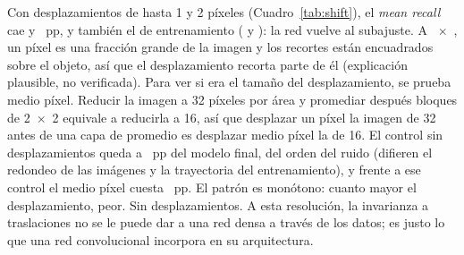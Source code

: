 {Con desplazamientos de hasta 1 y 2 píxeles (Cuadro~\ref{tab:shift}), el \emph{mean recall} cae
 y ~pp, y también el de entrenamiento ( y
): la red vuelve al subajuste. A ~$\times$~, un píxel es una
fracción grande de la imagen y los recortes están encuadrados sobre el objeto, así que el desplazamiento recorta parte
de él (explicación plausible, no verificada).}
{Para ver si era el tamaño del desplazamiento, se prueba medio píxel. Reducir la imagen a 32 píxeles por área y
promediar después bloques de 2~$\times$~2 equivale a reducirla a 16, así que desplazar un píxel la imagen de 32 antes
de una capa de promedio es desplazar medio píxel la de 16. El control sin desplazamientos queda a
~pp del modelo final, del orden del ruido (difieren el redondeo de las imágenes y la
trayectoria del entrenamiento), y frente a ese control el medio píxel cuesta ~pp. El patrón es
monótono: cuanto mayor el desplazamiento, peor.}
{Sin desplazamientos. A esta resolución, la invarianza a traslaciones no se le puede dar a una red densa a través de
los datos; es justo lo que una red convolucional incorpora en su arquitectura.}

\begin{table}[h]
  \centering
  \caption{Desplazamientos aleatorios sobre el modelo final ( semillas por fila). Las dos últimas
  filas usan la entrada de 32 píxeles con un promedio de 2~$\times$~2 delante de la red.}
  \label{tab:shift}
\end{table}
